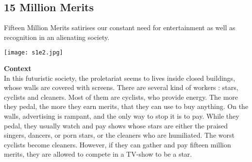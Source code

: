 \documentclass{article}
\begin{document}


\subsection{15 Million Merits}

Fifteen Million Merits satirises our constant need for entertainment as well as recognition in an alienating society. 
\begin{center}
\texttt{[image: s1e2.jpg]}
\end{center}

\textbf{Context}\\ 
In this futuristic society, the proletariat seems to lives inside closed buildings, whose walls are covered with screens. There are several kind of workers : stars, cyclists and cleaners. Most of them are cyclists, who provide energy. The more they pedal, the more they earn merits, that they can use to buy anything. On the walls, advertising is rampant, and the only way to stop it is to pay. While they pedal, they usually watch and pay shows whose stars are either the praised singers, dancers, or porn stars, or the cleaners who are humiliated. 
The worst cyclists become cleaners. However, if they can gather and pay fifteen million merits, they are allowed to compete in a TV-show to be a star.
\end{document}
